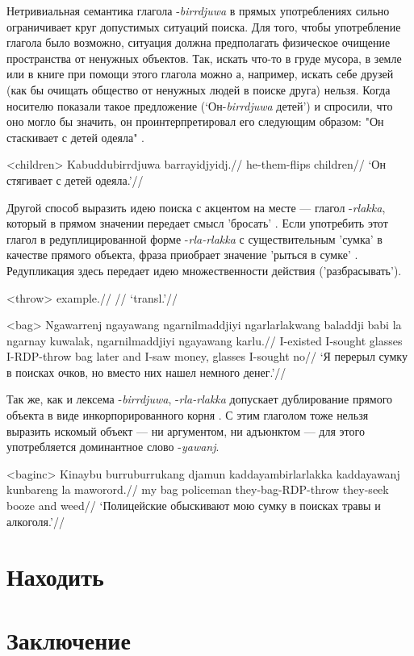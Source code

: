 Нетривиальная семантика глагола -\textit{birrdjuwa} в прямых употреблениях сильно ограничивает круг допустимых ситуаций поиска. Для того, чтобы употребление глагола было возможно, ситуация должна предполагать физическое очищение пространства от ненужных объектов. Так, искать что-то в груде мусора, в земле или в 
книге при помощи этого глагола можно а, например, искать себе друзей (как бы очищать общество от ненужных людей в поиске друга) нельзя. Когда носителю показали такое предложение (`Он-\textit{birrdjuwa} детей') и спросили, что оно могло бы значить, он проинтерпретировал его следующим образом: "Он стаскивает с детей одеяла" .

\ex<children>\begingl
\gla Kabuddubirrdjuwa barrayidjyidj.//
\glb he-them-flips children//
\glft `Он стягивает с детей одеяла.'\trailingcitation{[src]}//
\endgl\xe

Другой способ выразить идею поиска с акцентом на месте --- глагол -\textit{rlakka}, который в прямом значении передает смысл 'бросать' . Если употребить этот глагол в редуплицированной форме -\textit{rla-rlakka} с существительным 'сумка' в качестве прямого объекта, фраза приобрает значение 'рыться в сумке' . Редупликация здесь передает идею множественности действия ('разбрасывать'). 

\ex<throw>\begingl
\gla example.//
\glb //
\glft `transl.'\trailingcitation{[src]}//
\endgl\xe

\ex<bag>\begingl
\gla Ngawarrenj ngayawang ngarnilmaddjiyi ngarlarlakwang baladdji babi la ngarnay kuwalak, ngarnilmaddjiyi ngayawang karlu.//
\glb I-existed I-sought glasses I-RDP-throw bag later and I-saw money, glasses I-sought no//
\glft `Я перерыл сумку в поисках очков, но вместо них нашел немного денег.'\trailingcitation{[src]}//
\endgl\xe

Так же, как и лексема -\textit{birrdjuwa}, -\textit{rla-rlakka} допускает дублирование прямого объекта в виде инкорпорированного корня . С этим глаголом тоже нельзя выразить искомый объект --- ни аргументом, ни адъюнктом --- для этого употребляется доминантное слово -\textit{yawanj}.

\ex<baginc>\begingl
\gla Kinaybu burruburrukang djamun kaddayambirlarlakka kaddayawanj kunbareng la maworord.//
\glb my bag policeman they-bag-RDP-throw they-seek booze and weed//
\glft `Полицейские обыскивают мою сумку в поисках травы и алкоголя.'\trailingcitation{[src]}//
\endgl\xe


\section{Находить}

\section{Заключение}

